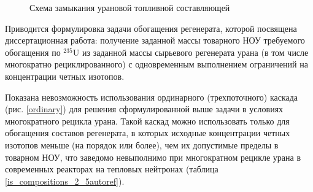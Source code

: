 \begin{figure}[ht]
  \caption{Схема замыкания урановой топливной составляющей}\label{fig_autoref2}
\end{figure}

Приводится формулировка задачи обогащения регенерата, которой посвящена диссертационная работа: получение заданной массы товарного НОУ требуемого обогащения по $^{235}$U из заданной массы сырьевого регенерата урана (в том числе многократно рециклированного) с одновременным выполнением ограничений на концентрации четных изотопов. 

Показана невозможность использования ординарного (трехпоточного) каскада (рис. \ref{ordinary}) для решения сформулированной выше задачи в условиях многократного рецикла урана. Такой каскад можно использовать только для обогащения составов регенерата, в которых исходные концентрации четных изотопов меньше (на порядок или более), чем их допустимые пределы в товарном НОУ, что заведомо невыполнимо при многократном рецикле урана в современных реакторах на тепловых нейтронах (таблица \ref{is_compositions_2_5autoref}).

